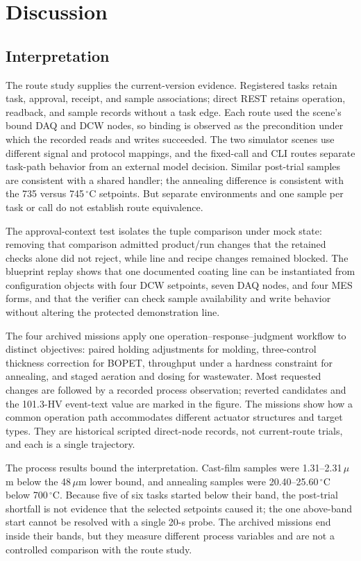 \section{Discussion}
\label{sec:discussion}
\subsection{Interpretation}
The route study supplies the current-version evidence. Registered tasks retain
task, approval, receipt, and sample associations; direct REST retains
operation, readback, and sample records without a task edge. Each route used
the scene's bound DAQ and DCW nodes, so binding is observed as the precondition
under which the recorded reads and writes succeeded. The two simulator scenes
use different signal and protocol mappings, and the fixed-call and CLI routes
separate task-path behavior from an external model decision. Similar
post-trial samples are consistent with a shared handler; the annealing
difference is consistent with the 735 versus 745\,$^{\circ}$C setpoints. But
separate environments and one sample per task or call do not establish route
equivalence.

The approval-context test isolates the tuple comparison under mock state:
removing that comparison admitted product/run changes that the retained checks
alone did not reject, while line and recipe changes remained blocked. The
blueprint replay shows that one documented coating line can be instantiated
from configuration objects with four DCW setpoints, seven DAQ nodes, and four
MES forms, and that the verifier can check sample availability and write
behavior without altering the protected demonstration line.

The four archived missions apply one operation--response--judgment workflow to
distinct objectives: paired holding adjustments for molding, three-control
thickness correction for BOPET, throughput under a hardness constraint for
annealing, and staged aeration and dosing for wastewater. Most requested
changes are followed by a recorded process observation; reverted candidates and
the 101.3-HV event-text value are marked in the figure. The missions show how a
common operation path accommodates different actuator structures and target
types. They are historical scripted direct-node records, not current-route
trials, and each is a single trajectory.

The process results bound the interpretation. Cast-film samples were
1.31--2.31\,$\mu$m below the 48\,$\mu$m lower bound, and annealing samples were
20.40--25.60\,$^{\circ}$C below 700\,$^{\circ}$C. Because five of six tasks
started below their band, the post-trial shortfall is not evidence that the
selected setpoints caused it; the one above-band start cannot be resolved with
a single 20-s probe. The archived missions end inside their bands, but they
measure different process variables and are not a controlled comparison with
the route study.

